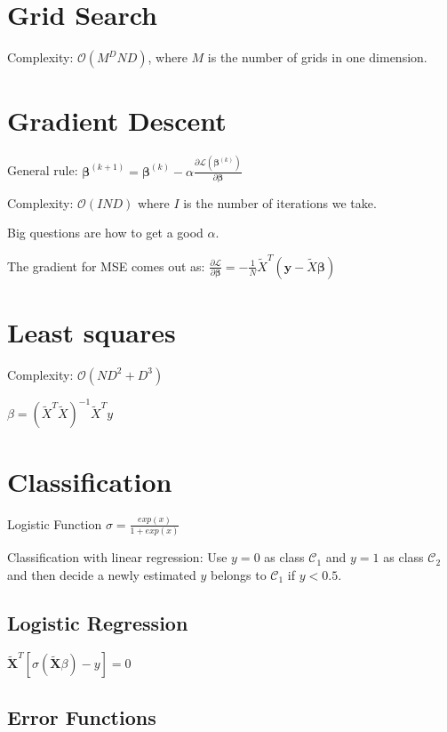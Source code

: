 \documentclass[10pt,a4paper,landscape]{article}
\begin{document}
\begin{multicols*}{4}
\section{Grid Search}
  Complexity: $\mathcal{O}(M^D N D)$, where $M$ is the number of grids in one dimension.

\section{Gradient Descent}
  General rule: $\boldsymbol\beta^{(k+1)} = \boldsymbol\beta^{(k)} - \alpha \frac{\partial \mathcal{L}(\boldsymbol\beta^{(k)})}{\partial \boldsymbol\beta}$

  Complexity: $\mathcal{O}(I N D)$ where $I$ is the number of iterations we take.

  Big questions are how to get a good $\alpha$.

  The gradient for MSE comes out as:
  $\frac{\partial \mathcal{L}}{\partial \boldsymbol\beta} = - \frac{1}{N} \tilde{X}^T ( \boldsymbol y - \tilde{X} \boldsymbol\beta )$

\section{Least squares}
  Complexity: $\mathcal{O}(ND^2 + D^3)$

  $\beta = ( \tilde{X}^T \tilde{X} )^{-1} \tilde{X}^T y$

\section{Classification}
  Logistic Function $\sigma = \frac{exp(x)}{1+exp(x)}$

  Classification with linear regression: Use $y = 0$ as class $\mathcal{C_1}$
  and $y = 1$ as class $\mathcal{C_2}$ and then decide a newly estimated $y$ belongs
  to $\mathcal{C_1}$ if $y < 0.5$.

  \subsection{Logistic Regression}
  $\tilde{\mathbf{X}}^T [\sigma(\tilde{\mathbf{X}} \beta) - y] = 0$

  \subsection{Error Functions}


\end{multicols*}
\end{document}
